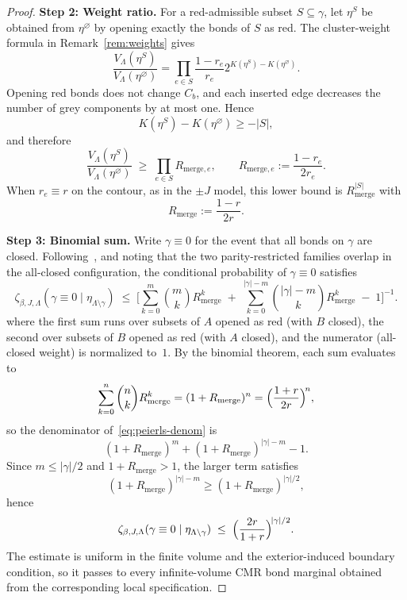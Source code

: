 \documentclass[11pt]{article}
\numberwithin{theorem}{section}
\theoremstyle{remark}
\begin{document}
\begin{proof}
\smallskip\noindent
\textbf{Step 2: Weight ratio.}
For a red-admissible subset $S \subseteq \gamma$, let $\eta^S$ be obtained from $\eta^\varnothing$ by opening exactly the bonds of $S$ as red.
The cluster-weight formula in Remark~\ref{rem:weights} gives
\[
  \frac{V_\Lambda(\eta^S)}{V_\Lambda(\eta^\varnothing)}
  = \prod_{e \in S}\frac{1-r_e}{r_e}
    2^{K(\eta^S)-K(\eta^\varnothing)}.
\]
Opening red bonds does not change $C_b$, and each inserted edge decreases the number of grey components by at most one.  Hence
\[
  K(\eta^S)-K(\eta^\varnothing) \geq -|S|,
\]
and therefore
\begin{equation}\label{eq:inhomogeneous-red-ratio}
  \frac{V_\Lambda(\eta^S)}{V_\Lambda(\eta^\varnothing)}
  \;\geq\; \prod_{e \in S} R_{\mathrm{merge},e},
  \qquad R_{\mathrm{merge},e} := \frac{1-r_e}{2r_e}.
\end{equation}
When $r_e \equiv r$ on the contour, as in the $\pm J$ model, this lower bound is $R_{\mathrm{merge}}^{|S|}$ with
\begin{equation}\label{eq:R-def}
  R_{\mathrm{merge}} := \frac{1-r}{2r}.
\end{equation}

\smallskip\noindent
\textbf{Step 3: Binomial sum.}
Write $\gamma \equiv 0$ for the event that all bonds on $\gamma$ are closed.
Following~\cite[eq.~(2.4)]{DSG1999}, and noting that the two parity-restricted families overlap in the all-closed configuration, the conditional probability of $\gamma \equiv 0$ satisfies
\begin{equation}\label{eq:peierls-denom}
  \zeta_{\beta,J,\Lambda}(\gamma \equiv 0 \mid \eta_{\Lambda \setminus \gamma})
  \;\leq\;
  \Biggl[
    \sum_{k=0}^{m} \binom{m}{k} R_{\mathrm{merge}}^k
    \;+\; \sum_{k=0}^{|\gamma|-m} \binom{|\gamma|-m}{k} R_{\mathrm{merge}}^k
    \;-\; 1
  \Biggr]^{-1}.
\end{equation}
where the first sum runs over subsets of $A$ opened as red (with $B$ closed), the second over subsets of $B$ opened as red (with $A$ closed), and the numerator (all-closed weight) is normalized to~$1$.
By the binomial theorem, each sum evaluates to
\[
  \sum_{k=0}^{n} \binom{n}{k} R_{\mathrm{merge}}^k
  = (1+R_{\mathrm{merge}})^n
  = \Bigl(\frac{1+r}{2r}\Bigr)^{\!n},
\]
so the denominator of~\eqref{eq:peierls-denom} is
\[
  (1+R_{\mathrm{merge}})^m
  + (1+R_{\mathrm{merge}})^{|\gamma|-m} - 1.
\]
Since $m \leq |\gamma|/2$ and $1+R_{\mathrm{merge}} > 1$, the larger term satisfies
\[
  (1+R_{\mathrm{merge}})^{|\gamma|-m}
  \geq (1+R_{\mathrm{merge}})^{|\gamma|/2},
\]
hence
\begin{equation}\label{eq:peierls}
  \zeta_{\beta,J,\Lambda}(\gamma \equiv 0 \mid \eta_{\Lambda \setminus \gamma})
  \;\leq\; \Bigl(\frac{2r}{1+r}\Bigr)^{\!|\gamma|/2}.
\end{equation}
The estimate is uniform in the finite volume and the exterior-induced boundary condition, so it passes to every infinite-volume CMR bond marginal obtained from the corresponding local specification.


\end{proof}
\end{document}
